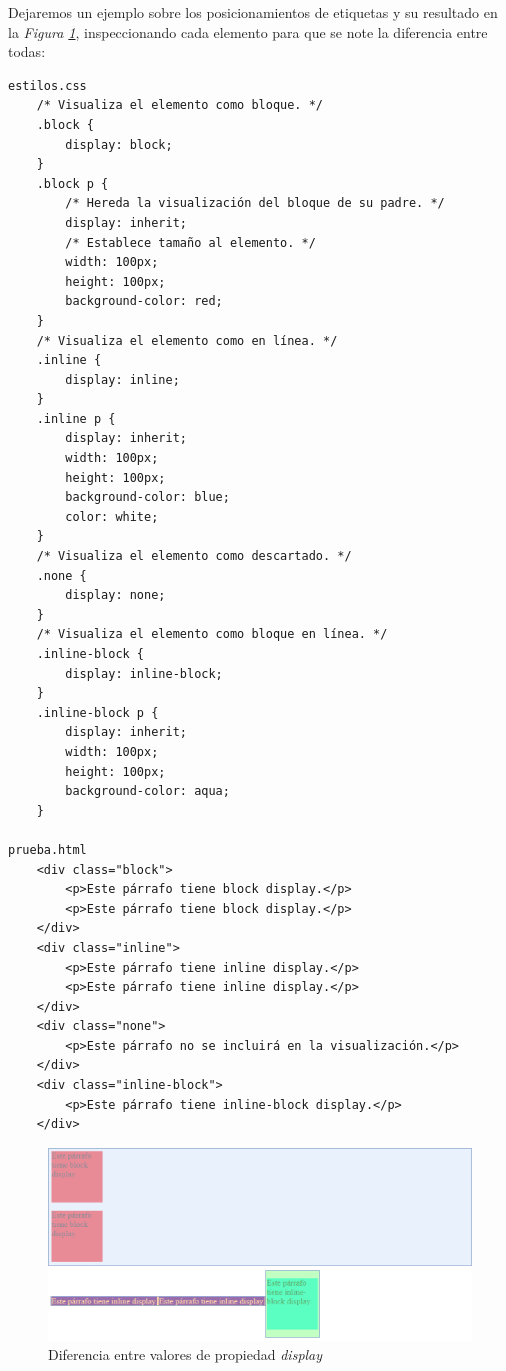 Dejaremos un ejemplo sobre los posicionamientos de etiquetas y su resultado en la \textit{Figura \ref{fig: 28}}, inspeccionando cada elemento para que se note la diferencia entre todas:
\begin{lstlisting}
estilos.css
    /* Visualiza el elemento como bloque. */
    .block {
        display: block;
    }
    .block p {
        /* Hereda la visualización del bloque de su padre. */
        display: inherit;
        /* Establece tamaño al elemento. */
        width: 100px;
        height: 100px;
        background-color: red;
    }
    /* Visualiza el elemento como en línea. */
    .inline {
        display: inline;
    }
    .inline p {
        display: inherit;
        width: 100px;
        height: 100px;
        background-color: blue;
        color: white;
    }
    /* Visualiza el elemento como descartado. */
    .none {
        display: none;
    }
    /* Visualiza el elemento como bloque en línea. */
    .inline-block {
        display: inline-block;
    }
    .inline-block p {
        display: inherit;
        width: 100px;
        height: 100px;
        background-color: aqua;
    }

prueba.html
    <div class="block">
        <p>Este párrafo tiene block display.</p>
        <p>Este párrafo tiene block display.</p>
    </div>
    <div class="inline">
        <p>Este párrafo tiene inline display.</p>
        <p>Este párrafo tiene inline display.</p>
    </div>
    <div class="none">
        <p>Este párrafo no se incluirá en la visualización.</p>
    </div>
    <div class="inline-block">
        <p>Este párrafo tiene inline-block display.</p>
    </div>
\end{lstlisting}
\begin{figure}[H]
    \centering
    \caption{Diferencia entre valores de propiedad \textit{display}}
    \label{fig: 28}
    \includegraphics[width=14cm]{ss/prop-display.png}
\end{figure}


